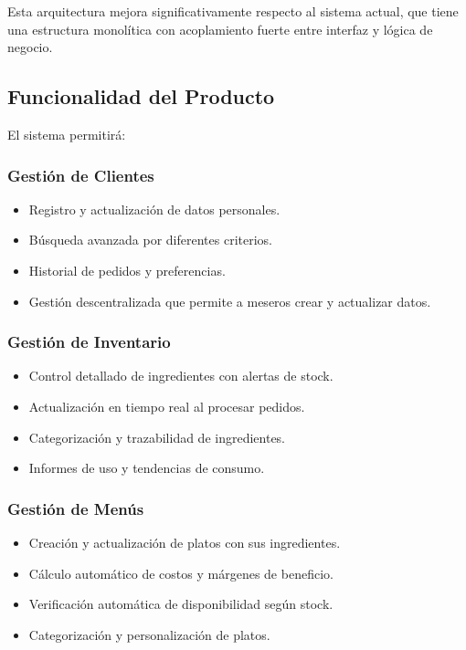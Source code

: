 \documentclass[12pt]{article}
\begin{document}
Esta arquitectura mejora significativamente respecto al sistema actual, que tiene una estructura monolítica con acoplamiento fuerte entre interfaz y lógica de negocio.

\subsection{Funcionalidad del Producto}
El sistema permitirá:

\subsubsection{Gestión de Clientes}
\begin{itemize}
  \item Registro y actualización de datos personales.
  \item Búsqueda avanzada por diferentes criterios.
  \item Historial de pedidos y preferencias.
  \item Gestión descentralizada que permite a meseros crear y actualizar datos.
\end{itemize}

\subsubsection{Gestión de Inventario}
\begin{itemize}
  \item Control detallado de ingredientes con alertas de stock.
  \item Actualización en tiempo real al procesar pedidos.
  \item Categorización y trazabilidad de ingredientes.
  \item Informes de uso y tendencias de consumo.
\end{itemize}

\subsubsection{Gestión de Menús}
\begin{itemize}
  \item Creación y actualización de platos con sus ingredientes.
  \item Cálculo automático de costos y márgenes de beneficio.
  \item Verificación automática de disponibilidad según stock.
  \item Categorización y personalización de platos.
\end{itemize}
\end{document}
